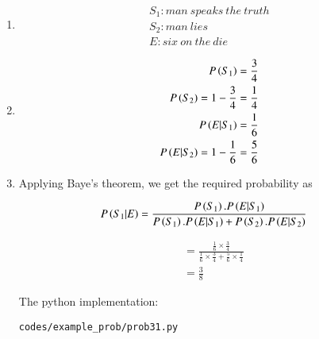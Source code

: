 \renewcommand{\theequation}{\theenumi}
\begin{enumerate}

\item 
\begin{align*}
S_1 : man\ speaks\ the\ truth \\
S_2: man\ lies \\
E: six\ on\ the\ die
\end{align*}


\item 
\begin{align*}
P\left(S_1\right) = \frac{3}{4}\\
P\left(S_2\right) = 1 - \frac{3}{4} =  \frac{1}{4} \\
P\left(E|S_1\right) = \frac{1}{6}\\
P\left(E|S_2\right) = 1 - \frac{1}{6} =  \frac{5}{6} \\
\end{align*}

\item Applying Baye's theorem, we get the required probability as 

\begin{small}
\begin{align*}
P\left(S_1|E\right) &= \frac{P\left(S_1\right).P\left(E|S_1\right)}{ P\left(S_1\right).P\left(E|S_1\right) + P\left(S_2\right).P\left(E|S_2\right) } 
\end{align*}
\end{small}

\begin{align*}
&= \frac{\frac{1}{6} \times \frac{3}{4}}{\frac{1}{6} \times \frac{3}{4} + \frac{5}{6} \times \frac{1}{4}}\\
&=\frac{3}{8}
\end{align*}

The python implementation:
\begin{lstlisting}
codes/example_prob/prob31.py
\end{lstlisting}

\end{enumerate}